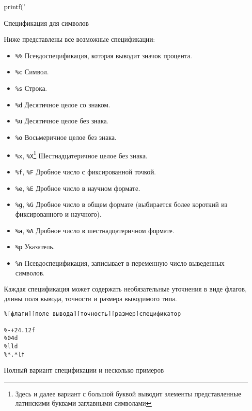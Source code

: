 \documentclass[12pt]{article}
\begin{document}
\begin{listing}[H]
\begin{center}
\begin{ccode}
printf("%
\end{ccode}
\end{center}
\caption{Спецификация для символов}
\label{lst:charspec}
\end{listing}

Ниже представлены все возможные спецификации:
\begin{itemize}
 \item \verb|%%| Псевдоспецификация, которая выводит значок процента.
 \item \verb|%c| Символ.
 \item \verb|%s| Строка.
 \item \verb|%d| Десятичное целое со знаком.
 \item \verb|%u| Десятичное целое без знака.
 \item \verb|%o| Восьмеричное целое без знака.
 \item \verb|%x|, \verb|%X|\footnote{Здесь и далее вариант с большой буквой выводит элементы представленные латинскими буквами заглавными символами} Шестнадцатеричное целое без знака.
 \item \verb|%f|, \verb|%F| Дробное число с фиксированной точкой.
 \item \verb|%e|, \verb|%E| Дробное число в научном формате.
 \item \verb|%g|, \verb|%G| Дробное число в общем формате (выбирается более короткий из фиксированного и научного).
 \item \verb|%a|, \verb|%A| Дробное число в шестнадцатеричном формате.
 \item \verb|%p| Указатель.
 \item \verb|%n| Псевдоспецификация, записывает в переменную число выведенных символов.
\end{itemize}

Каждая спецификация может содержать необязательные уточнения в виде флагов, длины поля вывода, точности и размера 
выводимого типа.

\begin{listing}[H]
\begin{center}
\begin{verbatim}
%[флаги][поле вывода][точность][размер]спецификатор

%-+24.12f
%04d
%lld
%*.*lf
\end{verbatim}
\end{center}
\caption{Полный вариант спецификации и несколько примеров}
\label{lst:specification}
\end{listing}
\end{document}
